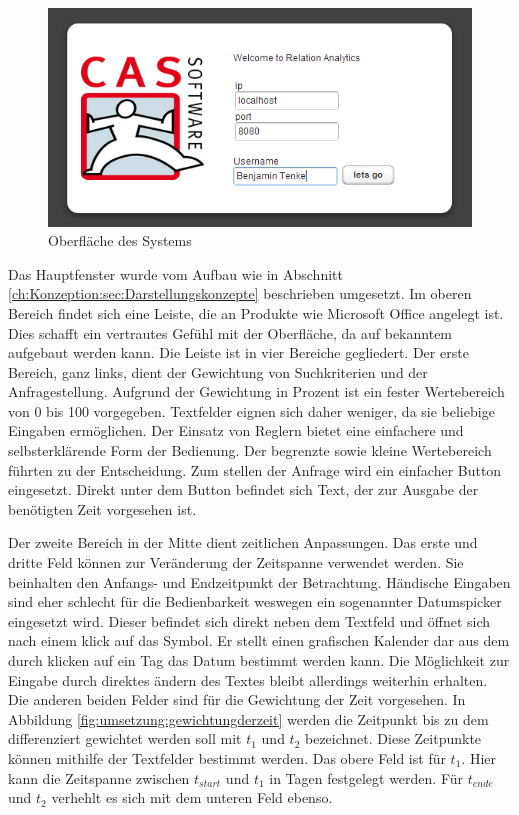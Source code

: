 \begin{figure}[htbp]
\centering
\includegraphics[scale=2.0]{pics/login.png}
\caption{Oberfläche des Systems}
\label{ergebniss_oberflaeche_anmeld}
\end{figure}

Das Hauptfenster wurde vom Aufbau wie in Abschnitt \ref{ch:Konzeption:sec:Darstellungskonzepte} beschrieben umgesetzt. Im oberen Bereich findet sich eine Leiste, die an Produkte wie Microsoft Office angelegt ist. Dies schafft ein vertrautes Gefühl mit der Oberfläche, da auf bekanntem aufgebaut werden kann. Die Leiste ist in vier Bereiche gegliedert. Der erste Bereich, ganz links, dient der Gewichtung von Suchkriterien und der Anfragestellung. Aufgrund der Gewichtung in Prozent ist ein fester Wertebereich von 0 bis 100 vorgegeben. Textfelder eignen sich daher weniger, da sie beliebige Eingaben ermöglichen. Der Einsatz von Reglern bietet eine einfachere und selbsterklärende Form der Bedienung. Der begrenzte sowie kleine Wertebereich führten zu der Entscheidung. Zum stellen der Anfrage wird ein einfacher Button eingesetzt. Direkt unter dem Button befindet sich Text, der zur Ausgabe der benötigten Zeit vorgesehen ist. 

Der zweite Bereich in der Mitte dient zeitlichen Anpassungen. Das erste und dritte Feld können zur Veränderung der Zeitspanne verwendet werden. Sie beinhalten den Anfangs- und Endzeitpunkt der Betrachtung. Händische Eingaben sind eher schlecht für die Bedienbarkeit weswegen ein sogenannter Datumspicker eingesetzt wird. Dieser befindet sich direkt neben dem Textfeld und öffnet sich nach einem klick auf das Symbol. Er stellt einen grafischen Kalender dar aus dem durch klicken auf ein Tag das Datum bestimmt werden kann. Die Möglichkeit zur Eingabe durch direktes ändern des Textes bleibt allerdings weiterhin erhalten. Die anderen beiden Felder sind für die Gewichtung der Zeit vorgesehen. In Abbildung \ref{fig:umsetzung:gewichtungderzeit} werden die Zeitpunkt bis zu dem differenziert gewichtet werden soll mit $t_1$ und $t_2$ bezeichnet. Diese Zeitpunkte können mithilfe der Textfelder bestimmt werden. Das obere Feld ist für $t_1$. Hier kann die Zeitspanne zwischen $t_{start}$ und $t_1$ in Tagen festgelegt werden. Für $t_{ende}$ und $t_2$ verhehlt es sich mit dem unteren Feld ebenso.

